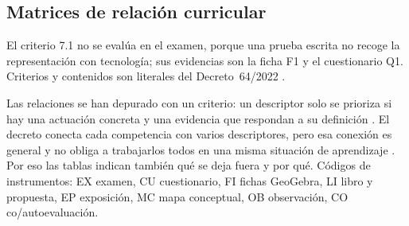 \clearpage
\begin{landscape}
\section{Matrices de relación curricular}\label{sec:matrices}
El criterio 7.1 no se evalúa en el examen, porque una prueba escrita no recoge la representación con tecnología; sus evidencias son la ficha F1 y el cuestionario Q1. Criterios y contenidos son literales del Decreto~64/2022 \parencite[pp.~324--328]{decreto64}.

Las relaciones se han depurado con un criterio: un descriptor solo se prioriza si hay una actuación concreta y una evidencia que respondan a su definición \parencite[anexo~I]{rd243}. El decreto conecta cada competencia con varios descriptores, pero esa conexión es general y no obliga a trabajarlos todos en una misma situación de aprendizaje \parencite[pp.~321--324]{decreto64}. Por eso las tablas indican también qué se deja fuera y por qué. Códigos de instrumentos: EX examen, CU cuestionario, FI fichas GeoGebra, LI libro y propuesta, EP exposición, MC mapa conceptual, OB observación, CO co/autoevaluación.

\end{landscape}
\clearpage
